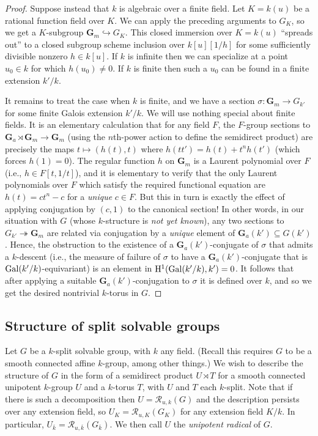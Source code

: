 \documentclass[10pt]{article}
\renewcommand{\(}{\left(}
\renewcommand{\)}{\right)}
\numberwithin{thm}{subsection}
\begin{document}
\begin{proof}
Suppose instead that $k$ is algebraic over a finite field.  Let $K = k(u)$ be a rational function
field over $K$.  We can apply the preceding arguments to $G_K$, so
we get a $K$-subgroup $\mathbf{G}_m \hookrightarrow G_K$.
This closed immersion over $K = k(u)$ ``spreads out'' to a closed
subgroup scheme inclusion over $k[u][1/h]$ for some sufficiently
divisible nonzero $h \in k[u]$.  If $k$ is infinite then we can specialize
at a point $u_0 \in k$ for which $h(u_0) \ne 0$.  If $k$ is finite
then such a $u_0$ can be found in a finite extension $k'/k$.

It remains to treat the case when $k$ is finite, and we have 
a section $\sigma:\mathbf{G}_m \rightarrow G_{k'}$
for some finite Galois extension $k'/k$.    We will use nothing special about
finite fields.   It is an elementary calculation that for any field $F$, the
$F$-group sections to $\mathbf{G}_a \rtimes \mathbf{G}_m \rightarrow \mathbf{G}_m$
(using the $n$th-power action to define the semidirect product) 
are precisely the maps $t \mapsto (h(t), t)$ where
$h(tt') = h(t) + t^n h(t')$ (which forces $h(1) = 0$). 
The regular function $h$ on $\mathbf{G}_m$ is a Laurent polynomial over $F$
(i.e., $h \in F[t,1/t]$), 
and it is elementary to verify that the only Laurent polynomials over $F$ which
satisfy the required functional equation are $h(t) = c t^n  - c$ for a {\em unique} $c \in F$. 
But this in turn is exactly the effect of applying conjugation by
$(c,1)$ to the canonical section!    In other words,
in our situation with $G$ (whose $k$-structure is {\em not yet known}),
any two sections to $G_{k'} \twoheadrightarrow \mathbf{G}_m$ are
related via conjugation by a {\em unique} element of
$\mathbf{G}_a(k') \subseteq G(k')$.    Hence, the obstruction
to the existence of a $\mathbf{G}_a(k')$-conjugate of
$\sigma$ that admits a $k$-descent (i.e., the measure of failure of
$\sigma$ to have a $\mathbf{G}_a(k')$-conjugate
that is ${\rm{Gal}}(k'/k)$-equivariant) is an element in
${\rm{H}}^1({\rm{Gal}}(k'/k),k') = 0$.  It follows
that after applying a suitable $\mathbf{G}_a(k')$-conjugation to $\sigma$
it is defined over $k$, and so we get the desired nontrivial $k$-torus in $G$.
\end{proof}

\subsection{Structure of split solvable groups}

Let $G$ be a $k$-split solvable group, with $k$ any field.
(Recall this requires $G$ to be a smooth connected affine $k$-group, among other things.)
We wish to describe the structure of $G$ in the form of a semidirect product
$U \rtimes T$ for a smooth connected unipotent $k$-group $U$
and a $k$-torus $T$, with $U$ and $T$  each $k$-split.
Note that if there is such a decomposition then
$U = \mathscr{R}_{u,k}(G)$ and the description persists
over any extension field, so $U_K = \mathscr{R}_{u,K}(G_K)$
for any extension field $K/k$.  In particular,
$U_{\overline{k}} = \mathscr{R}_{u,\overline{k}}(G_{\overline{k}})$.
We then call $U$ the {\em unipotent radical} of $G$.
\end{document}
